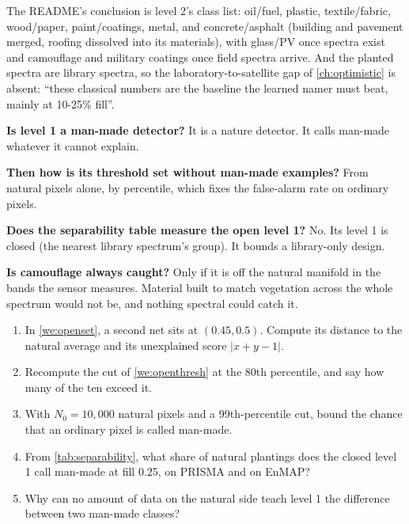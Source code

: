 \documentclass[11pt,a4paper,oneside,openany]{book}
\begin{document}
The README's conclusion is level 2's class list: oil/fuel, plastic, textile/fabric, wood/paper, paint/coatings, metal, and concrete/asphalt (building and pavement
merged, roofing dissolved into its materials), with glass/PV once spectra exist and camouflage and military coatings once field spectra arrive. And the planted
spectra are library spectra, so the laboratory-to-satellite gap of \cref{ch:optimistic} is absent: ``these classical numbers are the baseline the learned namer must beat,
mainly at 10-25\% fill''.

\begin{confusions}
\textbf{Is level 1 a man-made detector?} It is a nature detector. It calls man-made whatever it cannot explain.

\textbf{Then how is its threshold set without man-made examples?} From natural pixels alone, by percentile, which fixes the false-alarm rate on ordinary pixels.

\textbf{Does the separability table measure the open level 1?} No. Its level 1 is closed (the nearest library spectrum's group). It bounds a library-only design.

\textbf{Is camouflage always caught?} Only if it is off the natural manifold in the bands the sensor measures. Material built to match vegetation across the whole
spectrum would not be, and nothing spectral could catch it.
\end{confusions}

\begin{checkyourself}
\begin{enumerate}
\item In \cref{we:openset}, a second net sits at $(0.45,0.5)$. Compute its distance to the natural average and its unexplained score $|x+y-1|$.
\item Recompute the cut of \cref{we:openthresh} at the 80th percentile, and say how many of the ten exceed it.
\item With $N_0=10{,}000$ natural pixels and a 99th-percentile cut, bound the chance that an ordinary pixel is called man-made.
\item From \cref{tab:separability}, what share of natural plantings does the closed level 1 call man-made at fill 0.25, on PRISMA and on EnMAP?
\item Why can no amount of data on the natural side teach level 1 the difference between two man-made classes?
\end{enumerate}
\end{checkyourself}
\end{document}

